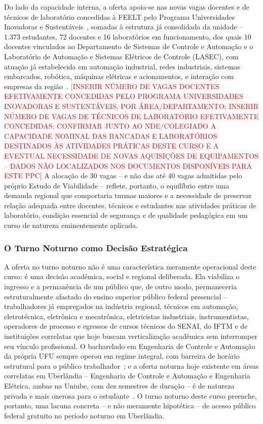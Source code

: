 Do lado da capacidade interna, a oferta apoia-se nas novas vagas docentes e de técnicos de laboratório concedidas à FEELT pelo Programa Universidades Inovadoras e Sustentáveis~\cite{programa_universidades_inovadoras_sustentaveis}, somadas à estrutura já consolidada da unidade -- 1.373 estudantes, 72 docentes e 16 laboratórios em funcionamento, dos quais 10 docentes vinculados ao Departamento de Sistemas de Controle e Automação e o Laboratório de Automação e Sistemas Elétricos de Controle (LASEC), com atuação já estabelecida em automação industrial, redes industriais, sistemas embarcados, robótica, máquinas elétricas e acionamentos, e interação com empresas da região~\cite{feelt_numeros}. \textcolor{red}{[INSERIR NÚMERO DE VAGAS DOCENTES EFETIVAMENTE CONCEDIDAS PELO PROGRAMA UNIVERSIDADES INOVADORAS E SUSTENTÁVEIS, POR ÁREA/DEPARTAMENTO; INSERIR NÚMERO DE VAGAS DE TÉCNICOS DE LABORATÓRIO EFETIVAMENTE CONCEDIDAS; CONFIRMAR JUNTO AO NDE/COLEGIADO A CAPACIDADE NOMINAL DAS BANCADAS E LABORATÓRIOS DESTINADOS ÀS ATIVIDADES PRÁTICAS DESTE CURSO E A EVENTUAL NECESSIDADE DE NOVAS AQUISIÇÕES DE EQUIPAMENTOS -- DADOS NÃO LOCALIZADOS NOS DOCUMENTOS DISPONÍVEIS PARA ESTE PPC]} A alocação de 30 vagas -- e não das até 40 vagas admitidas pelo próprio Estudo de Viabilidade -- reflete, portanto, o equilíbrio entre uma demanda regional que comportaria turmas maiores e a necessidade de preservar relação adequada entre docentes, técnicos e estudantes nas atividades práticas de laboratório, condição essencial de segurança e de qualidade pedagógica em um curso de natureza eminentemente aplicada.

\subsubsection{O Turno Noturno como Decisão Estratégica}

A oferta no turno noturno não é uma característica meramente operacional deste curso: é uma decisão acadêmica, social e regional deliberada. Ela viabiliza o ingresso e a permanência de um público que, de outro modo, permaneceria estruturalmente afastado do ensino superior público federal presencial -- trabalhadores já empregados na indústria regional, técnicos em automação, eletrotécnica, eletrônica e mecatrônica, eletricistas industriais, instrumentistas, operadores de processo e egressos de cursos técnicos do SENAI, do IFTM e de instituições correlatas que hoje buscam verticalização acadêmica sem interromper seu vínculo profissional. O bacharelado em Engenharia de Controle e Automação da própria UFU sempre operou em regime integral, com barreira de horário estrutural para o público trabalhador~\cite{ufu_estudo_viabilidade_cst_2026}; e a oferta noturna hoje existente em áreas correlatas em Uberlândia -- Engenharia de Controle e Automação e Engenharia Elétrica, ambas na Uniube, com dez semestres de duração -- é de natureza privada e mais onerosa para o estudante~\cite{ufu_estudo_viabilidade_cst_2026}. O turno noturno deste curso preenche, portanto, uma lacuna concreta -- e não meramente hipotética -- de acesso público federal gratuito no período noturno em Uberlândia.

